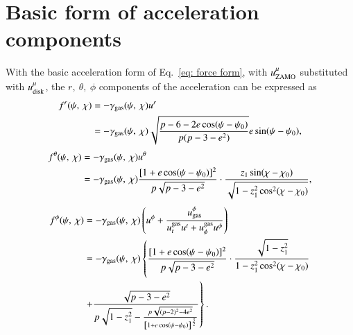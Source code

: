 \documentclass[aps,prx,reprint,superscriptaddress,nofootinbib,longbibliography]{revtex4-1}
\begin{document}
\section{Basic form of acceleration components}\label{appendix:form of acceleration}
With the basic acceleration form of Eq.~\eqref{eq: force form}, with $u^{\mu}_{\rm ZAMO}$ substituted with $u^{\mu}_{\rm disk}$, the $r,\ \theta,\ \phi$ components of the acceleration can be expressed as
\begin{equation}
\begin{aligned}
    f^{r}(\psi,\ \chi)&=-\gamma_{\rm gas}(\psi,\ \chi)u^{r}\\
    &=-\gamma_{\rm gas}(\psi,\ \chi)\sqrt{\frac{p-6-2e\cos(\psi-\psi_{0})}{p(p-3-e^2)}}e\sin(\psi-\psi_{0}),
\end{aligned}
\label{eq:ar}
\end{equation}
\begin{equation}
\begin{aligned}
    f^{\theta}(\psi,\ \chi)&=-\gamma_{\rm gas}(\psi,\ \chi)u^{\theta}\\
    &=-\gamma_{\rm gas}(\psi,\ \chi)\frac{[1+e\cos(\psi-\psi_{0})]^2}{p\sqrt{p-3-e^2}}\cdot\frac{z_{1}\sin(\chi-\chi_{0})}{\sqrt{1-z_{1}^{2}\cos^{2}(\chi-\chi_{0})}},
\end{aligned}
\label{eq:atheta}
\end{equation}
\begin{equation}
    \begin{aligned}
        f^{\phi}(\psi,\ \chi)&=-\gamma_{\rm gas}(\psi,\ \chi)\left(u^{\phi}+\frac{u^{\phi}_{\rm gas}}{u^{\rm gas}_{t}u^{t}+u^{\rm gas}_{\phi}u^{\phi}}\right)\\
        &=-\gamma_{\rm gas}(\psi,\ \chi)\left\{\frac{[1+e\cos(\psi-\psi_{0})]^{2}}{p\sqrt{p-3-e^2}}\cdot\frac{\sqrt{1-z_{1}^2}}{1-z_{1}^{2}\cos^{2}(\chi-\chi_{0})}\right.\\
        &\left.+\frac{\sqrt{p-3-e^2}}{p\sqrt{1-z_{1}^{2}}-\frac{p\sqrt{(p-2)^2-4e^2}}{\left[1+e\cos(\psi-\psi_{0})\right]^{\frac{3}{2}}}}\right\}.
    \end{aligned}
\label{eq:aphi}
\end{equation}
\end{document}
